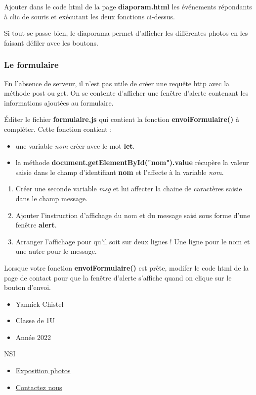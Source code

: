 Ajouter dans le code html de la page \textbf{diaporam.html} les
événements répondants à clic de souris et exécutant les deux fonctions
ci-dessus.

Si tout se passe bien, le diaporama permet d'afficher les différentes
photos en les faisant défiler avec les boutons.

\hypertarget{le-formulaire}{%
\subsubsection{Le formulaire}\label{le-formulaire}}

En l'absence de serveur, il n'est pas utile de créer une requête http
avec la méthode post ou get. On se contente d'afficher une fenêtre
d'alerte contenant les informations ajoutées au formulaire.

Éditer le fichier \textbf{formulaire.js} qui contient la fonction
\textbf{envoiFormulaire()} à compléter. Cette fonction contient :

\begin{itemize}
\tightlist
\item
  une variable \emph{nom} créer avec le mot \textbf{let}.
\item
  la méthode \textbf{document.getElementById("nom").value} récupère la
  valeur saisie dans le champ d'identifiant \textbf{nom} et l'affecte à
  la variable \emph{nom}.
\end{itemize}

\begin{enumerate}
\tightlist
\item
  Créer une seconde variable \emph{msg} et lui affecter la chaine de
  caractères saisie dans le champ message.
\item
  Ajouter l'instruction d'affichage du nom et du message saisi sous
  forme d'une fenêtre \textbf{alert}.
\item
  Arranger l'affichage pour qu'il soit sur deux lignes ! Une ligne pour
  le nom et une autre pour le message.
\end{enumerate}

Lorsque votre fonction \textbf{envoiFormulaire()} est prête, modifer le
code html de la page de contact pour que la fenêtre d'alerte s'affiche
quand on clique sur le bouton d'envoi.

\hypertarget{footer}{}
\begin{itemize}
\tightlist
\item
  Yannick Chistel
\item
  Classe de 1U
\item
  Année 2022
\end{itemize}

NSI

\begin{itemize}
\tightlist
\item
  \href{diaporama.html}{Exposition photos}
\item
  \href{contact.html}{Contactez nous}
\end{itemize}
